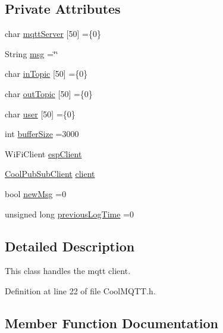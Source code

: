 \subsection*{Private Attributes}
\begin{DoxyCompactItemize}
\item 
char \hyperlink{class_cool_m_q_t_t_ab8bb951f87ddbf92db74c2ad16a3e53e}{mqtt\+Server} \mbox{[}50\mbox{]} =\{\textquotesingle{}0\textquotesingle{}\}
\item 
String \hyperlink{class_cool_m_q_t_t_af6b19e7074dbbb4ae493c44dcb53f7ff}{msg} =\char`\"{}\char`\"{}
\item 
char \hyperlink{class_cool_m_q_t_t_a4492f52a441e83cc5151010317fdb52d}{in\+Topic} \mbox{[}50\mbox{]} =\{\textquotesingle{}0\textquotesingle{}\}
\item 
char \hyperlink{class_cool_m_q_t_t_a109c786a17b463f9eeba046194279522}{out\+Topic} \mbox{[}50\mbox{]} =\{\textquotesingle{}0\textquotesingle{}\}
\item 
char \hyperlink{class_cool_m_q_t_t_a8cd47e45d457f908d4b4390b35aaee83}{user} \mbox{[}50\mbox{]} =\{\textquotesingle{}0\textquotesingle{}\}
\item 
int \hyperlink{class_cool_m_q_t_t_a7f3cf26b51d6770f216e42c5ef13ca9f}{buffer\+Size} =3000
\item 
Wi\+Fi\+Client \hyperlink{class_cool_m_q_t_t_acc30a0200967374a524092a8a806502a}{esp\+Client}
\item 
\hyperlink{class_cool_pub_sub_client}{Cool\+Pub\+Sub\+Client} \hyperlink{class_cool_m_q_t_t_afed1372683c44893b4668d0f1771f514}{client}
\item 
bool \hyperlink{class_cool_m_q_t_t_a3240388137b885775aadf38e96b24c6b}{new\+Msg} =0
\item 
unsigned long \hyperlink{class_cool_m_q_t_t_a3db37ef9ed3b05b2a8d44edba0e7d3cc}{previous\+Log\+Time} =0
\end{DoxyCompactItemize}


\subsection{Detailed Description}
This class handles the mqtt client. 

Definition at line 22 of file Cool\+M\+Q\+T\+T.\+h.



\subsection{Member Function Documentation}
\mbox{\label{class_cool_m_q_t_t_ac9248808641ebf3054ed0620ea9d0100}} 
